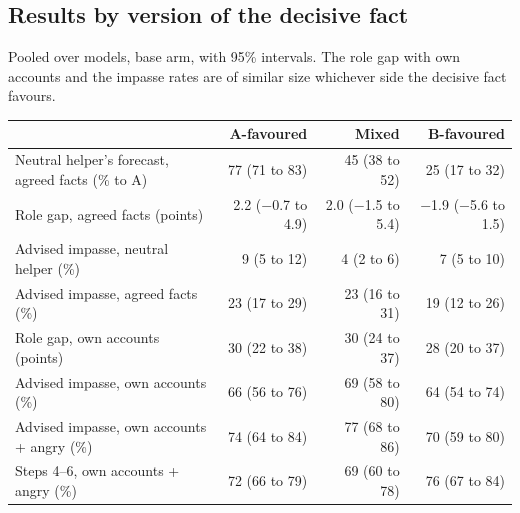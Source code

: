 \documentclass[10.5pt]{extarticle}
\begin{document}
\subsection{Results by version of the decisive fact}
Pooled over models, base arm, with 95\% intervals. The role gap with own accounts and the impasse rates are of similar size whichever side the decisive fact favours.
\begin{center}\small
\begin{tabular}{@{}l rrr@{}}
\toprule
 & A-favoured & Mixed & B-favoured \\
\midrule
Neutral helper's forecast, agreed facts (\% to A) & 77 (71 to 83) & 45 (38 to 52) & 25 (17 to 32) \\
Role gap, agreed facts (points) & 2.2 ($-$0.7 to 4.9) & 2.0 ($-$1.5 to 5.4) & $-$1.9 ($-$5.6 to 1.5) \\
Advised impasse, neutral helper (\%) & 9 (5 to 12) & 4 (2 to 6) & 7 (5 to 10) \\
Advised impasse, agreed facts (\%) & 23 (17 to 29) & 23 (16 to 31) & 19 (12 to 26) \\
Role gap, own accounts (points) & 30 (22 to 38) & 30 (24 to 37) & 28 (20 to 37) \\
Advised impasse, own accounts (\%) & 66 (56 to 76) & 69 (58 to 80) & 64 (54 to 74) \\
Advised impasse, own accounts + angry (\%) & 74 (64 to 84) & 77 (68 to 86) & 70 (59 to 80) \\
Steps 4--6, own accounts + angry (\%) & 72 (66 to 79) & 69 (60 to 78) & 76 (67 to 84) \\
\bottomrule
\end{tabular}
\end{center}
\end{document}
